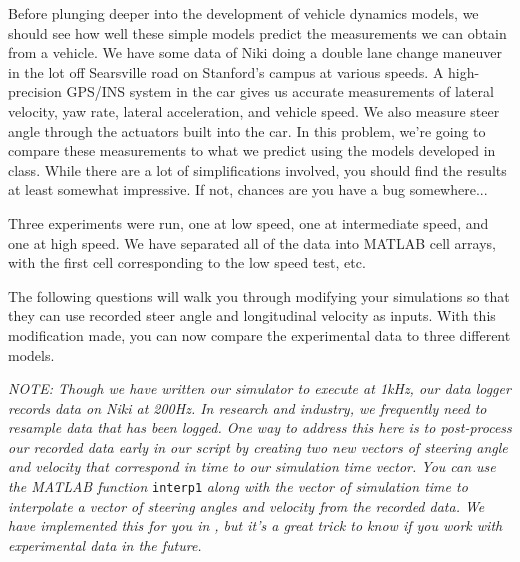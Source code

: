 
Before plunging deeper into the development of vehicle dynamics models, we should see how well these simple models
predict the measurements we can obtain from a vehicle. We have some data of Niki doing a double lane change maneuver in
the lot off Searsville road on Stanford's campus at various speeds. A high-precision GPS/INS system in the car gives us
accurate measurements of lateral velocity, yaw rate, lateral acceleration, and vehicle speed. We also measure steer
angle through the actuators built into the car. In this problem, we're going to compare these measurements to what we
predict using the models developed in class. While there are a lot of simplifications involved, you should find the
results at least somewhat impressive. If not, chances are you have a bug somewhere...

Three experiments were run, one at low speed, one at intermediate speed, and one at high speed. We have separated all of
the data into MATLAB cell arrays, with the first cell corresponding to the low speed test, etc. 

The following \GRno{} questions will walk you through modifying your simulations so that they can use recorded steer
angle and longitudinal velocity as inputs. With this modification made, you can now compare the experimental data to
three different models.

\textit{NOTE: Though we have written our simulator to execute at 1kHz, our data logger records data on Niki at 200Hz.  In research and industry, we frequently need to resample data that has been logged. One way to address this here is to post-process our recorded data early in our script by creating two new vectors of steering angle and velocity that correspond in time to our simulation time vector. 
You can use the MATLAB function} \verb!interp1! \textit{along with the vector of simulation time to interpolate a vector of
steering angles and velocity from the recorded data. We have implemented this for you in \GRno{}, but it's a great trick to know if
you work with experimental data in the future.}

\vspace*{1cm}
